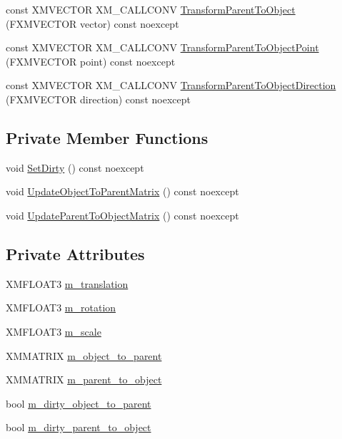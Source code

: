 \begin{DoxyCompactItemize}
\item 
const X\+M\+V\+E\+C\+T\+OR X\+M\+\_\+\+C\+A\+L\+L\+C\+O\+NV \hyperlink{classmage_1_1_transform_a305841f6bbc0a4eadaacbce2918b438c}{Transform\+Parent\+To\+Object} (F\+X\+M\+V\+E\+C\+T\+OR vector) const noexcept
\item 
const X\+M\+V\+E\+C\+T\+OR X\+M\+\_\+\+C\+A\+L\+L\+C\+O\+NV \hyperlink{classmage_1_1_transform_a4b420feb6f839d045a0239056b47772d}{Transform\+Parent\+To\+Object\+Point} (F\+X\+M\+V\+E\+C\+T\+OR point) const noexcept
\item 
const X\+M\+V\+E\+C\+T\+OR X\+M\+\_\+\+C\+A\+L\+L\+C\+O\+NV \hyperlink{classmage_1_1_transform_a0f84d13bf0016a6c98d84ccf0d357b50}{Transform\+Parent\+To\+Object\+Direction} (F\+X\+M\+V\+E\+C\+T\+OR direction) const noexcept
\end{DoxyCompactItemize}
\subsection*{Private Member Functions}
\begin{DoxyCompactItemize}
\item 
void \hyperlink{classmage_1_1_transform_a8d760d79f5ad68377706234b8575e429}{Set\+Dirty} () const noexcept
\item 
void \hyperlink{classmage_1_1_transform_ae959687d6ffe73bda0a71f2f6f4b9dbe}{Update\+Object\+To\+Parent\+Matrix} () const noexcept
\item 
void \hyperlink{classmage_1_1_transform_a55829fd7bc87753f6a1c6facfc12ca80}{Update\+Parent\+To\+Object\+Matrix} () const noexcept
\end{DoxyCompactItemize}
\subsection*{Private Attributes}
\begin{DoxyCompactItemize}
\item 
X\+M\+F\+L\+O\+A\+T3 \hyperlink{classmage_1_1_transform_a57e27b28e0cf85be034055a68513ad79}{m\+\_\+translation}
\item 
X\+M\+F\+L\+O\+A\+T3 \hyperlink{classmage_1_1_transform_a037b4fb338bfe79aa2ab1a2e809c40df}{m\+\_\+rotation}
\item 
X\+M\+F\+L\+O\+A\+T3 \hyperlink{classmage_1_1_transform_a25d15c85b93037bab5b755c86bef0b54}{m\+\_\+scale}
\item 
X\+M\+M\+A\+T\+R\+IX \hyperlink{classmage_1_1_transform_ad21d0547b1648f22f6b28db044b1d4bd}{m\+\_\+object\+\_\+to\+\_\+parent}
\item 
X\+M\+M\+A\+T\+R\+IX \hyperlink{classmage_1_1_transform_a4ca7fe2fe7ec7e09cda91e6af63f07f9}{m\+\_\+parent\+\_\+to\+\_\+object}
\item 
bool \hyperlink{classmage_1_1_transform_a0b6df5bbb04bb38efb3123b4749afc98}{m\+\_\+dirty\+\_\+object\+\_\+to\+\_\+parent}
\item 
bool \hyperlink{classmage_1_1_transform_a3d415d6a36e2307538c2da461e517a6d}{m\+\_\+dirty\+\_\+parent\+\_\+to\+\_\+object}
\end{DoxyCompactItemize}
